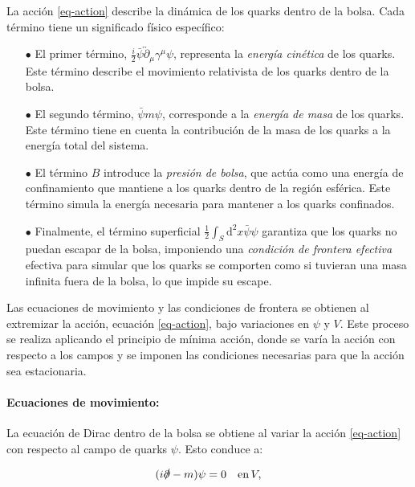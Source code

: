 La acción \eqref{eq-action} describe la dinámica de los quarks dentro de la bolsa. Cada término tiene un significado físico específico:
\begin{itemize}
    \item[$\bullet$] El primer término, \( \frac{i}{2} \bar{\psi} \overleftrightarrow{\partial}_{\mu} {\gamma}^{\mu} \psi \), representa la \emph{energía cinética} de los quarks. Este término describe el movimiento relativista de los quarks dentro de la bolsa.
    
    \item[$\bullet$] El segundo término, \( \bar{\psi} m \psi \), corresponde a la \emph{energía de masa}  de los quarks. Este término tiene en cuenta la contribución de la masa de los quarks a la energía total del sistema.
    
    \item[$\bullet$] El término \( B \) introduce la \emph{presión de bolsa}, que actúa como una energía de confinamiento que mantiene a los quarks dentro de la región esférica. Este término simula la energía necesaria para mantener a los quarks confinados.
    
    \item[$\bullet$] Finalmente, el término superficial \( \frac{1}{2} \int_{S} \mathrm{d}^{2} x \bar{\psi} \psi \) garantiza que los quarks no puedan escapar de la bolsa, imponiendo una  \emph{condición de frontera efectiva} efectiva para simular que los quarks se comporten como si tuvieran una masa infinita fuera de la bolsa, lo que impide su escape.
\end{itemize} %

Las ecuaciones de movimiento y las condiciones de frontera se obtienen al extremizar la acción, ecuación \eqref{eq-action}, bajo variaciones en $\psi$ y $V$. Este proceso se realiza aplicando el principio de mínima acción, donde se varía la acción con respecto a los campos y se imponen las condiciones necesarias para que la acción sea estacionaria.

\paragraph{Ecuaciones de movimiento:}
La ecuación de Dirac dentro de la bolsa se obtiene al variar la acción \eqref{eq-action} con respecto al campo de quarks $\psi$. Esto conduce a:

\begin{equation}\label{eq-deq}
( i \slashed{\partial} - m) \psi= 0 \quad \mathrm{en} \, V,
\end{equation}

